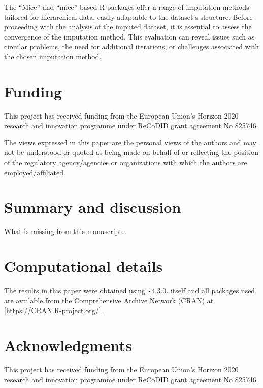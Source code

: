 \documentclass[
  article]{jss}
\begin{document}
The ``Mice'' and ``mice''-based R packages offer a range of imputation
methods tailored for hierarchical data, easily adaptable to the
dataset's structure. Before proceeding with the analysis of the imputed
dataset, it is essential to assess the convergence of the imputation
method. This evaluation can reveal issues such as circular problems, the
need for additional iterations, or challenges associated with the chosen
imputation method.

\hypertarget{funding}{%
\section{Funding}\label{funding}}

This project has received funding from the European Union's Horizon 2020
research and innovation programme under ReCoDID grant agreement No
825746.

The views expressed in this paper are the personal views of the authors
and may not be understood or quoted as being made on behalf of or
reflecting the position of the regulatory agency/agencies or
organizations with which the authors are employed/affiliated.

\hypertarget{sec-summary}{%
\section{Summary and discussion}\label{sec-summary}}

What is missing from this manuscript\ldots{}

\hypertarget{computational-details}{%
\section*{Computational details}\label{computational-details}}

The results in this paper were obtained using
\textasciitilde4.3.0.  itself and all packages
used are available from the Comprehensive  Archive Network
(CRAN) at {[}https://CRAN.R-project.org/{]}.

\hypertarget{acknowledgments}{%
\section*{Acknowledgments}\label{acknowledgments}}

This project has received funding from the European Union's Horizon 2020
research and innovation programme under ReCoDID grant agreement No
825746.
\end{document}
